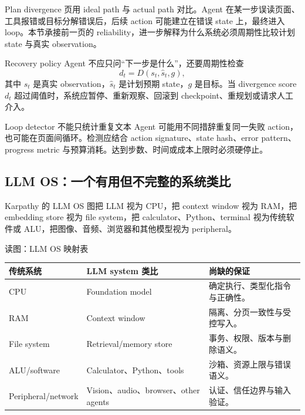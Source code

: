 Plan divergence 页用 ideal path 与 actual path 对比。Agent 在某一步误读页面、工具报错或目标分解错误后，后续 action 可能建立在错误 state 上，最终进入 loop。本节承接前一页的 reliability，进一步解释为什么系统必须周期性比较计划 state 与真实 observation。


\begin{importantbox}{Recovery policy}
Agent 不应只问“下一步是什么”，还要周期性检查
\[
d_t=D(s_t,\hat{s}_t,g),
\]
其中 $s_t$ 是真实 observation，$\hat{s}_t$ 是计划预期 state，$g$ 是目标。当 divergence score $d_t$ 超过阈值时，系统应暂停、重新观察、回滚到 checkpoint、重规划或请求人工介入。
\end{importantbox}

\begin{warningbox}{Loop detector 不能只统计重复文本}
Agent 可能用不同措辞重复同一失败 action，也可能在页面间循环。检测应结合 action signature、state hash、error pattern、progress metric 与预算消耗。达到步数、时间或成本上限时必须硬停止。
\end{warningbox}


\subsection{LLM OS：一个有用但不完整的系统类比}

Karpathy 的 LLM OS 图把 LLM 视为 CPU，把 context window 视为 RAM，把 embedding store 视为 file system，把 calculator、Python、terminal 视为传统软件或 ALU，把图像、音频、浏览器和其他模型视为 peripheral。


\begin{knowledgebox}{读图：LLM OS 映射表}
\begin{tabularx}{\textwidth}{L{0.22\textwidth} L{0.24\textwidth} X}
\toprule
传统系统 & LLM system 类比 & 尚缺的保证 \\
\midrule
CPU & Foundation model & 确定执行、类型化指令与正确性。 \\
RAM & Context window & 隔离、分页一致性与受控写入。 \\
File system & Retrieval/memory store & 事务、权限、版本与删除语义。 \\
ALU/software & Calculator、Python、tools & 沙箱、资源上限与错误语义。 \\
Peripheral/network & Vision、audio、browser、other agents & 认证、信任边界与输入验证。 \\
\bottomrule
\end{tabularx}
\end{knowledgebox}

